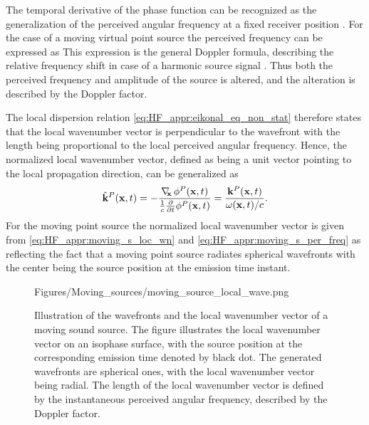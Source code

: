 The temporal derivative of the phase function can be recognized as the generalization of the perceived angular frequency at a fixed receiver position \cite{Morse1968}.
For the case of a moving virtual point source the perceived frequency can be expressed as 
This expression is the general Doppler formula, describing the relative frequency shift in case of a harmonic source signal \cite{Morse1968}. 
Thus both the perceived frequency and amplitude of the source is altered, and the alteration is described by the Doppler factor.

The local dispersion relation \eqref{eq:HF_appr:eikonal_eq_non_stat} therefore states that the local wavenumber vector is perpendicular to the wavefront with the length being proportional to the local perceived angular frequency.
Hence, the normalized local wavenumber vector, defined as being a unit vector pointing to the local propagation direction, can be generalized as
\begin{equation}
\label{eq:Moving_source:local_wn_general}
\hat{\mathbf{k}}^P(\mathbf{x},t) = -\frac{\nabla_{\!\!\mathbf{x}}\, \phi^P(\mathbf{x},t)}{\frac{1}{c}\frac{\partial}{\partial t} \phi^P(\mathbf{x},t)}  = \frac{\mathbf{k}^P(\mathbf{x},t)}{ \omega(\mathbf{x},t)/c }.
\end{equation}
For the moving point source the normalized local wavenumber vector is given from \eqref{eq:HF_appr:moving_s_loc_wn} and \eqref{eq:HF_appr:moving_s_per_freq} as
reflecting the fact that a moving point source radiates spherical wavefronts with the center being the source position at the emission time instant.
\begin{figure} 
	\small
    \begin{minipage}[c]{0.6\textwidth}
    \hspace{0cm}
	\begin{overpic}[width = 1.0\columnwidth ]{Figures/Moving_sources/moving_source_local_wave.png}
	\small
	\end{overpic} 
	\end{minipage}
	\hspace{10mm}
	\begin{minipage}[c]{0.35\textwidth}
    \caption{
	Illustration of the wavefronts and the local wavenumber vector of a moving sound source.
	The figure illustrates the local wavenumber vector on an isophase surface, with the source position at the corresponding emission time denoted by black dot.
	The generated wavefronts are spherical ones, with the local wavenumber vector being radial.
	The length of the local wavenumber vector is defined by the instantaneous perceived angular frequency, described by the Doppler factor.}
	\label{Fig:Moving_source:moving_source_local_wn}
	\end{minipage}
\end{figure}  

